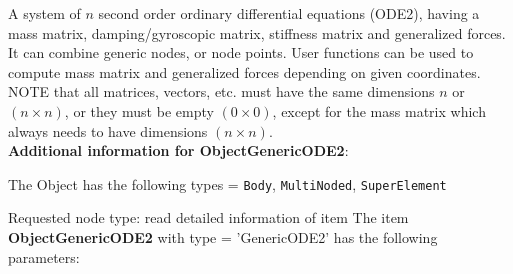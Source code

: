 \label{sec:item:ObjectGenericODE2}
A system of $n$ second order ordinary differential equations (ODE2), having a mass matrix, damping/gyroscopic matrix, stiffness matrix and generalized forces. It can combine generic nodes, or node points. User functions can be used to compute mass matrix and generalized forces depending on given coordinates. NOTE that all matrices, vectors, etc. must have the same dimensions $n$ or $(n \times n)$, or they must be empty $(0 \times 0)$, except for the mass matrix which always needs to have dimensions $(n \times n)$.\vspace{12pt}
 \\{\bf Additional information for ObjectGenericODE2}:
\bi
  \item The Object has the following types = \texttt{Body}, \texttt{MultiNoded}, \texttt{SuperElement}
  \item Requested node type: read detailed information of item
\ei
\vspace{12pt} \noindent The item {\bf ObjectGenericODE2} with type = 'GenericODE2' has the following parameters:\vspace{-1cm}\\ 
